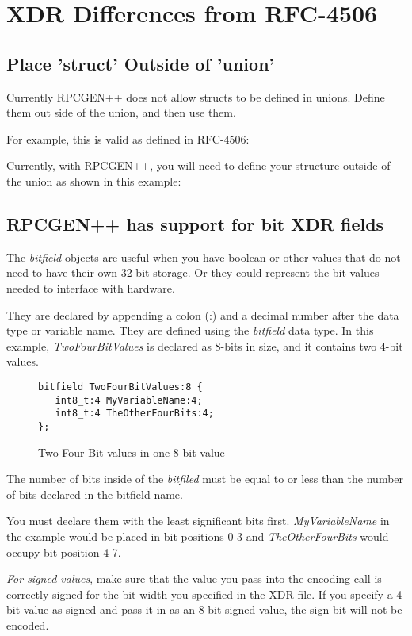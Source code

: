 \section{XDR Differences from RFC-4506}
\subsection{Place 'struct' Outside of 'union'}
Currently RPCGEN++ does not allow structs to be defined in unions.
Define them out side of the union, and then use them.

For example, this is valid as defined in RFC-4506:


Currently, with RPCGEN++, you will need to define your
structure outside of the union as shown in this example:


\subsection{RPCGEN++ has support for bit XDR fields}
The \textit{bitfield} objects are useful when you have boolean or other
values that do not need to have their own 32-bit storage.
Or they could represent the bit values needed to interface
with hardware.

They are declared by appending a colon (:) and a decimal number
after the data type or variable name.
They are defined using the \textit{bitfield} data type.
In this example, \textit{TwoFourBitValues} is declared
as 8-bits in size, and it contains two 4-bit values.
\begin{figure}
\begin{verbatim}
bitfield TwoFourBitValues:8 {
   int8_t:4 MyVariableName:4;
   int8_t:4 TheOtherFourBits:4;
};
\end{verbatim}
\caption{Two Four Bit values in one 8-bit value}
\label{fig:A32BitExampleXDR}
\end{figure}

The number of bits inside of the \textit{bitfiled} must be equal to or
less than the number of bits declared in the bitfield name.

You must declare them with the least significant bits first.
\textit{MyVariableName} in the example would be placed in
bit positions 0-3 and \textit{TheOtherFourBits} would occupy
bit position 4-7.

\textit{For signed values}, make sure that the value you pass
into the encoding call is correctly signed for the bit
width you specified in the XDR file.
If you specify a 4-bit value as signed
and pass it in as an 8-bit signed value, the sign bit will not
be encoded.

